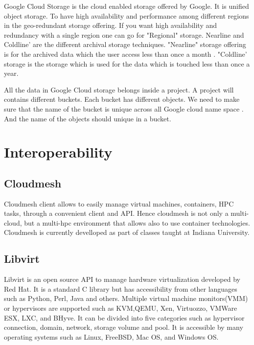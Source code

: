      Google Cloud Storage is the cloud enabled storage offered by
     Google. \cite{www-google-cloud-storage} It is unified object
     storage. To have high availability and performance among
     different regions in the geo-redundant storage offering. If you
     want high availability and redundancy with a single region one
     can go for "Regional" storage. Nearline and Coldline’ are the
     different archival storage techniques. "Nearline" storage
     offering is for the archived data which the user access less than
     once a month . "Coldline’ storage is the storage which is used
     for the data which is touched less than once a year.

     All the data in Google Cloud storage belongs inside a project. A
     project will contains different buckets. Each bucket has
     different objects. We need to make sure that the name of the
     bucket is unique across all Google cloud name space . And the
     name of the objects should unique in a bucket.


\section{Interoperability}
\label{S:o-interoperability}


\subsection{Cloudmesh}

Cloudmesh client allows to easily manage virtual machines, containers,
HPC tasks, through a convenient client and API. Hence cloudmesh is not
only a multi-cloud, but a multi-hpc environment that allows also to
use container technologies. Cloudmesh is currently develloped as part
of classes taught at Indiana University.

\subsection{Libvirt}

     Libvirt is an open source API to manage hardware virtualization
     developed by Red Hat.  It is a standard C library but has
     accessibility from other languages such as Python, Perl, Java and
     others. \cite{www-libvirt} Multiple virtual machine
     monitors(VMM) or hypervisors are supported such as KVM,QEMU, Xen,
     Virtuozzo, VMWare ESX, LXC, and BHyve.  It can be divided into
     five categories such as hypervisor connection, domain, network,
     storage volume and pool.  \cite{www-ibm} It is accessible by
     many operating systems such as Linux, FreeBSD, Mac OS, and
     Windows OS.
     
